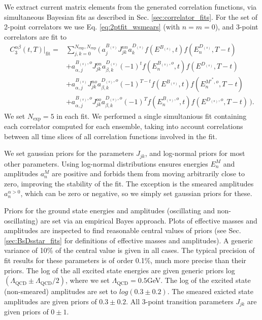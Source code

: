 We extract current matrix elements from the generated correlation functions, via simultaneous Bayesian fits as described in Sec. \ref{sec:correlator_fits}. For the set of 2-point correlators we use Eq. \eqref{eq:2ptfit_wsmears} (with $n=m=0$), and 3-point correlators are fit to
\begin{align}
  \nonumber
  C^{\alpha\beta}_{3}(t,T)|_{\text{fit}} =& \sum_{j,k=0}^{N_{\text{exp}},N_{\text{exp}}} \Big(\, a^{B_{(s)}}_j J^{nn}_{jk} a^{D_{(s)}}_k f(E^{B_{(s)}},t) f(E^{D_{(s)}}_n,T-t)
  \\ \nonumber
  &+a^{B_{(s)},o}_{\alpha,j} J^{on}_{jk} a_{\beta,k}^{D_{(s)}} (-1)^t f(E^{B_{(s)},o}_n,t) f(E^{D_{(s)}},T-t)
  \\ \nonumber
  &+a_{\alpha,j}^{B_{(s)}} J^{no}_{jk} a_{\beta,k}^{D_{(s)},o} (-1)^{T-t} f(E^{B_{(s)}},t) f(E^{M'^*,o}_n,T-t)
  \\
  &+a_{\alpha,j}^{B_{(s)},o} J^{oo}_{jk} a_{\beta,k}^{D_{(s)},o} (-1)^T f(E^{B_{(s)},o}_n,t) f(E^{D_{(s)},o},T-t) \,\Big).
  \label{eq:3ptcorrelator_real}
\end{align}
We set $N_{\text{exp}}=5$ in each fit. We performed a single simultanious fit containing each correlator computed for each ensemble, taking into account correlations between all time slices of all correlation functions involved in the fit.

We set gaussian priors for the parameters $J_{jk}$, and log-normal priors for most other parameters. Using log-normal distributions ensures energies $E_n^M$ and amplitudes $a_n^M$ are positive and forbids them from moving arbitrarily close to zero, improving the stability of the fit. The exception is the smeared amplitudes $a^{\alpha>0}_n$, which can be zero or negative, so we simply set gaussian priors for these.

Priors for the ground state energies and amplitudes (oscillating and non-oscillating) are set via an empirical Bayes approach. Plots of effective masses and amplitudes are inspected to find reasonable central values of priors (see Sec. \ref{sec:BsDsstar_fits} for definitions of effective masses and amplitudes). A generic variance of 10\% of the central value is given in all cases. The typical precision of fit results for these parameters is of order 0.1\%, much more precise than their priors. The log of the all excited state energies are given generic priors log$(\Lambda_{\text{QCD}}\pm\Lambda_{\text{QCD}}/2)$, where we set $\Lambda_{\text{QCD}}=0.5$GeV. The log of the excited state (non-smeared) amplitudes are set to $log(0.3\pm 0.2)$. The smeared exicted state amplitudes are given priors of  $0.3\pm 0.2$. All 3-point transition parameters $J_{jk}$ are given priors of $0\pm 1$.

